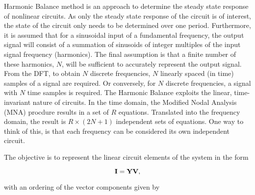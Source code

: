 \documentclass[12pt,journal,compsoc]{../ieeepaper/IEEEtran}
\begin{document}
% 
% 
% 
% 
Harmonic Balance method is an approach to determine the steady state response of nonlinear
circuits.
As only the steady state response of the circuit is of interest, the state of the circuit
only needs to be determined over one period.
Furthermore, it is assumed that for a sinusoidal input of a
fundamental frequency, the output signal will consist of a summation of sinusoids of integer multiples of
the input signal frequency (harmonics).
The final assumption is that a finite number of these harmonics,
\( N \), will be sufficient to accurately represent the output signal.
From the DFT, to obtain \( N \) discrete frequencies, \( N \) linearly spaced (in time) samples of a
signal are required.
Or conversely, for \( N \) discrete frequencies, a signal with \( N \) time samples is required.
The Harmonic Balance exploits the linear, time-invariant nature of circuits.
In the time domain, the Modified Nodal Analysis (MNA) procdure results in a set of \( R \) equations.
Translated into the 
frequency domain, the result is \( R \times (2 N + 1) \) independent sets of equations.
One way to
think of this, is that each frequency can be considered its own independent circuit.

The objective is to represent the linear circuit elements of the system in the form 

\begin{equation}\label{eqn:ece1254projectReport:560}
\BI = \BY \BV,
\end{equation}

with an ordering of the vector components given by
\end{document}

